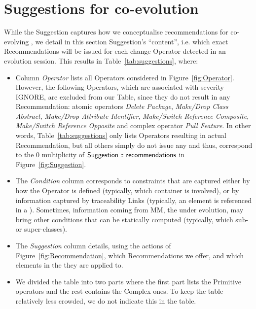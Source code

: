 \section{Suggestions for \viewtype co-evolution} 
\label{sec:Approach}


While the \textsf{Suggestion} \metamodel captures how we
conceptualise recommendations for co-evolving \viewtypes, we detail
in this section \textsf{Suggestion}'s ``content'', i.e. which exact \textsf{Recommendation}s
will be issued for each change \textsf{Operator} detected in an evolution
session. This results in Table~\ref{tab:suggestions}, where:
\begin{itemize}
	\item Column \textsl{Operator} lists all \textsf{Operator}s considered in Figure~\ref{fig:Operator}. 
    However, the following \textsf{Operator}s, which are
	associated with severity \textsf{IGNORE}, are excluded from our Table, since 
	they do not result in any \textsf{Recommendation}: atomic operators \textit{Delete Package}, 
	\textit{Make/Drop Class Abstract}, \textit{Make/Drop Attribute Identifier}, 
	\textit{Make/Switch Reference Composite}, \textit{Make/Switch Reference Opposite}
	and complex operator \textit{Pull Feature}. In other words, Table~\ref{tab:suggestions} only
	lists \textsf{Operator}s resulting in actual \textsf{Recommendation}, but all
	others simply do not issue any and thus, correspond to the \textsf{0} multiplicity
	of $\mathsf{Suggestion} \,\colon\!\!\!\colon \mathsf{recommendations}$ in Figure~\ref{fig:Suggestion}.
	
	\item The \textsl{Condition} column corresponds to constraints that are captured
	either by how the \textsf{Operator} is defined (typically, which \textsf{container}
	is involved), or by information captured by traceability \textsf{Link}s (typically,
	an element is referenced in a \viewtype). Sometimes, information coming from \textsf{MM},
	the \metamodel under evolution, may bring other conditions that can be statically
	computed (typically, which sub- or super-classes). 
	
	\item The \textsl{Suggestion} column details, using the actions of Figure~\ref{fig:Recommendation}, which \textsf{Recommendation}s we offer, and which elements in the \viewtype they are applied to.

    \item We divided the table into two parts where the first part lists the \textsf{Primitive} operators and the rest contains the \textsf{Complex} ones. To keep the table relatively less crowded, we do not indicate this in the table.
\end{itemize}


